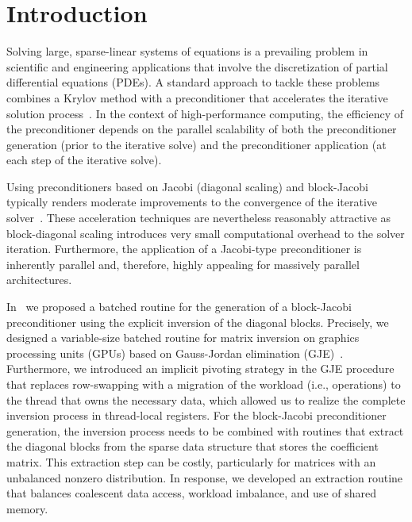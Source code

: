 \section{Introduction}
\label{2017-gje-block-jacobi:sec:s1-intro}

Solving large, sparse-linear systems of equations is a prevailing problem
in scientific and engineering applications that involve the discretization of
partial differential equations (PDEs). A standard approach to tackle these
problems combines a Krylov method with a preconditioner that accelerates the
iterative solution process~\cite{saad}. In the context of high-performance
computing, the efficiency of the preconditioner depends on the parallel
scalability of both the preconditioner generation (prior to the iterative solve)
and the preconditioner application (at each step of the iterative solve).

Using preconditioners based on Jacobi (diagonal scaling) and block-Jacobi
typically renders moderate improvements to the convergence of the iterative
solver~\cite{saad}. These acceleration techniques are nevertheless reasonably
attractive as block-diagonal scaling introduces very small computational
overhead to the solver iteration.
Furthermore, the application of a Jacobi-type preconditioner is inherently
parallel and, therefore, highly appealing for massively parallel architectures.

In~\cite{Anzt:2017:BGE:3026937.3026940} we proposed a batched routine for the 
generation of a block-Jacobi preconditioner using the explicit inversion of the
diagonal blocks. Precisely, we designed a variable-size batched routine for
matrix inversion on graphics processing units (GPUs) based on Gauss-Jordan
elimination (GJE)~\cite{Householder}. Furthermore, we introduced an implicit
pivoting strategy in the GJE procedure that replaces row-swapping {with a
	migration of the workload (i.e., operations) to the thread that owns the
	necessary data}, which allowed us to realize the complete inversion process in thread-local
registers. For the block-Jacobi preconditioner generation, the inversion process
needs to be combined with routines that extract the diagonal blocks from the
sparse data structure that stores the coefficient matrix. This extraction step
can be costly, particularly for matrices with an unbalanced nonzero
distribution. In response, we developed an extraction routine that balances
coalescent data access, workload imbalance, and use of shared memory.

